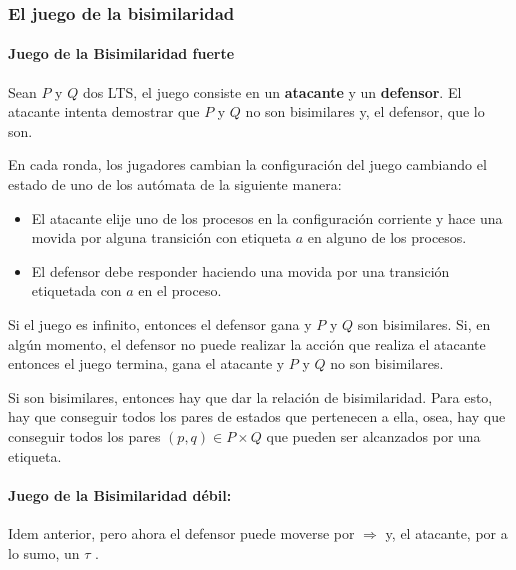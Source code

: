 \subsubsection{El juego de la bisimilaridad}
\paragraph{Juego de la Bisimilaridad fuerte}
Sean $P$ y $Q$ dos LTS, el juego consiste en un \textbf{atacante} y un \textbf{defensor}. El atacante intenta demostrar que $P$ y $Q$ no son bisimilares y, el defensor, que lo son.

En cada ronda, los jugadores cambian la configuración del juego cambiando el estado de uno de los autómata de la siguiente manera:
\begin{itemize}
    \item El atacante elije uno de los procesos en la configuración corriente y hace una movida por alguna transición con etiqueta $a$ en alguno de los procesos.
    \item El defensor debe responder haciendo una movida por una transición etiquetada con $a$ en el  proceso.
\end{itemize}

Si el juego es infinito, entonces el defensor gana y $P$ y $Q$ son bisimilares. Si, en algún momento, el defensor no puede realizar la acción que realiza el atacante entonces el juego termina, gana el atacante y $P$ y $Q$ no son bisimilares.

Si son bisimilares, entonces hay que dar la relación de bisimilaridad. Para esto, hay que conseguir todos los pares de estados que pertenecen a ella, osea, hay que conseguir todos los pares $(p,q)\in P\times Q$ que pueden ser alcanzados por una etiqueta.

\paragraph{Juego de la Bisimilaridad débil:} Idem anterior, pero ahora el defensor puede moverse por $\Rightarrow$ y, el atacante, por a lo sumo, un $\tau$ .